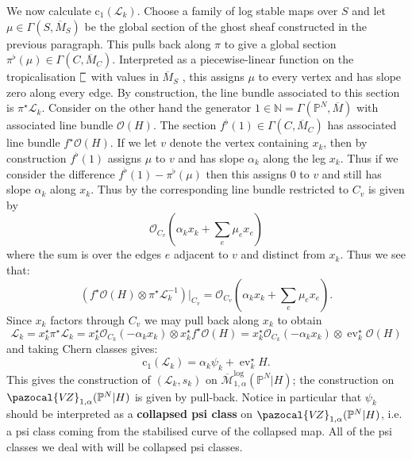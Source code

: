 \documentclass[11pt]{amsart}
\newcommand{\sqC}{\scalebox{0.8}[1.3]{$\sqsubset$}}
\newcommand{\MLog}{\overline{\mathcal{M}}^{\operatorname{log}}}
\newcommand{\PP}{\mathbb P}
\newcommand{\VZ}{\pazocal{V\!Z}}
\newcommand{\st}{\star}
\newcommand{\N}{\mathbb{N}}
\newcommand{\OO}{\mathcal{O}}
\newcommand{\ev}{\operatorname{ev}}
\newcommand{\Lcal}{\mathcal{L}}
\newcommand{\cchern}{\mathrm{c}}
\newcommand{\ol}[1]{\overline{#1}}
\theoremstyle{definition}
\theoremstyle{definition}
\begin{document}
We now calculate $\cchern_1(\Lcal_k)$. Choose a family of log stable maps over $S$ and let $\mu \in \Gamma(S,\ol{M}_S)$ be the global section of the ghost sheaf constructed in the previous paragraph. This pulls back along $\pi$ to give a global section $\pi^\flat(\mu) \in \Gamma(C,\ol{M}_C)$.  Interpreted as a piecewise-linear function on the tropicalisation $\sqC$ with values in $\ol{M}_S$ \cite[Remark 7.3]{CavalieriChanUlirschWise}, this assigns $\mu$ to every vertex and has slope zero along every edge. By construction, the line bundle associated to this section is $\pi^\st \Lcal_k$. Consider on the other hand the generator $1 \in \N = \Gamma(\PP^N,\ol{M})$ with associated line bundle $\OO(H)$. The section $f^\flat(1) \in \Gamma(C,\ol{M}_C)$ has associated line bundle $f^\st\OO(H)$. If we let $v$ denote the vertex containing $x_k$, then by construction $f^\flat(1)$ assigns $\mu$ to $v$ and has slope $\alpha_k$ along the leg $x_k$. Thus if we consider the difference $f^\flat(1) - \pi^\flat(\mu)$ then this assigns $0$ to $v$ and still has slope $\alpha_k$ along $x_k$. Thus by \cite[Proposition 2.4.1]{RSPW} the corresponding line bundle restricted to $C_v$ is given by
\begin{equation*} \OO_{C_v} \left(\alpha_k x_k + \sum_e \mu_e x_e \right) \end{equation*}
where the sum is over the edges $e$ adjacent to $v$ and distinct from $x_k$. Thus we see that:
\begin{equation*} \left( f^\st\OO(H) \otimes \pi^\st \Lcal_k^{-1} \right) \big|_{C_v} = \OO_{C_v} \left(\alpha_k x_k + \sum_e \mu_e x_e \right).\end{equation*}
Since $x_k$ factors through $C_v$ we may pull back along $x_k$ to obtain
\begin{equation*} \Lcal_k = x_k^\st\pi^\st \Lcal_k = x_k^\st \OO_{C_k}(-\alpha_k x_k) \otimes x_k^\st f^\st\OO(H) = x_k^\st \OO_{C_k}(-\alpha_k x_k) \otimes \ev_k^\st \OO(H) \end{equation*}
and taking Chern classes gives:
\begin{equation*} \cchern_1(\Lcal_k) = \alpha_k \psi_k + \ev_k^\st H.\end{equation*}
This gives the construction of $(\Lcal_k,s_k)$ on $\MLog_{1,\alpha}(\PP^N|H)$; the construction on $\VZ_{1,\alpha}(\PP^N|H)$ is given by pull-back. Notice in particular that $\psi_k$ should be interpreted as a \textbf{collapsed psi class} on $\VZ_{1,\alpha}(\PP^N|H)$, i.e. a psi class coming from the stabilised curve of the collapsed map. All of the psi classes we deal with will be collapsed psi classes.
\end{document}
